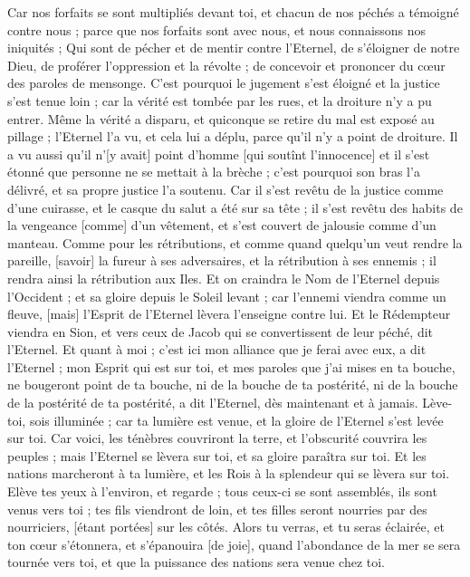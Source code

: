 \begin{multicols}{2}
Car nos forfaits se sont multipliés devant toi, et chacun de nos péchés a témoigné contre nous ; parce que nos forfaits sont avec nous, et nous connaissons nos iniquités ;
Qui sont de pécher et de mentir contre l'Eternel, de s'éloigner de notre Dieu, de proférer l'oppression et la révolte ; de concevoir et prononcer du cœur des paroles de mensonge.
C'est pourquoi le jugement s'est éloigné et la justice s'est tenue loin ; car la vérité est tombée par les rues, et la droiture n'y a pu entrer.
Même la vérité a disparu, et quiconque se retire du mal est exposé au pillage ; l'Eternel l'a vu, et cela lui a déplu, parce qu'il n'y a point de droiture.
Il a vu aussi qu'il n'[y avait] point d'homme [qui soutînt l'innocence] et il s'est étonné que personne ne se mettait à la brèche ; c'est pourquoi son bras l'a délivré, et sa propre justice l'a soutenu.
Car il s'est revêtu de la justice comme d'une cuirasse, et le casque du salut a été sur sa tête ; il s'est revêtu des habits de la vengeance [comme] d'un vêtement, et s'est couvert de jalousie comme d'un manteau.
Comme pour les rétributions, et comme quand quelqu'un veut rendre la pareille, [savoir] la fureur à ses adversaires, et la rétribution à ses ennemis ; il rendra ainsi la rétribution aux Iles.
Et on craindra le Nom de l'Eternel depuis l'Occident ; et sa gloire depuis le Soleil levant ; car l'ennemi viendra comme un fleuve, [mais] l'Esprit de l'Eternel lèvera l'enseigne contre lui.
Et le Rédempteur viendra en Sion, et vers ceux de Jacob qui se convertissent de leur péché, dit l'Eternel.
Et quant à moi ; c'est ici mon alliance que je ferai avec eux, a dit l'Eternel ; mon Esprit qui est sur toi, et mes paroles que j'ai mises en ta bouche, ne bougeront point de ta bouche, ni de la bouche de ta postérité, ni de la bouche de la postérité de ta postérité, a dit l'Eternel, dès maintenant et à jamais.
\VerseOne{}Lève-toi, sois illuminée ; car ta lumière est venue, et la gloire de l'Eternel s'est levée sur toi.
Car voici, les ténèbres couvriront la terre, et l'obscurité couvrira les peuples ; mais l'Eternel se lèvera sur toi, et sa gloire paraîtra sur toi.
Et les nations marcheront à ta lumière, et les Rois à la splendeur qui se lèvera sur toi.
Elève tes yeux à l'environ, et regarde ; tous ceux-ci se sont assemblés, ils sont venus vers toi ; tes fils viendront de loin, et tes filles seront nourries par des nourriciers, [étant portées] sur les côtés.
Alors tu verras, et tu seras éclairée, et ton cœur s'étonnera, et s'épanouira [de joie], quand l'abondance de la mer se sera tournée vers toi, et que la puissance des nations sera venue chez toi.

\end{multicols}

